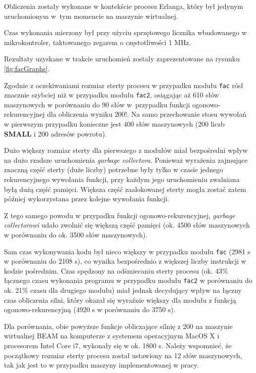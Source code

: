 Obliczenia zostały wykonane w kontekście procesu Erlanga, który był jedynym uruchomionym w~tym momencie na maszynie wirtualnej.

Czas wykonania mierzony był przy użyciu sprzętowego licznika wbudowanego w mikrokontroler, taktowanego zegarem o częstotliwości 1 MHz.

Rezultaty uzyskane w trakcie uruchomień zostały zaprezentowane na rysunku \ref{fig:facGraphs}.


Zgodnie z oczekiwaniami rozmiar sterty procesu w przypadku modułu \texttt{fac} rósł znacznie szybciej niż w przypadku modułu \texttt{fac2}, osiągając aż 610 słów maszynowych
w porównaniu do 90 słów w~przypadku funkcji ogonowo-rekurencyjnej dla obliczenia wyniku $200!$.
Na samo przechowanie stosu wywołań w pierwszym przypadku konieczne jest 400 słów maszynowych (200 liczb \textbf{SMALL} i 200 adresów powrotu).

Dużo większy rozmiar sterty dla pierwszego z modułów miał bezpośredni wpływ na dużo rzadsze uruchomienia \emph{garbage collectora}.
Ponieważ wyrażenia zajmujące znaczną część sterty (duże liczby) potrzebne były tylko w czasie jednego rekurencyjnego wywołania funkcji, przy każdym jego uruchomieniu zwalniana byłą dużą część pamięci. Większa część zaalokowanej sterty mogła zostać zatem później wykorzystana przez kolejne wywołania funkcji.

Z tego samego powodu w przypadku funkcji ogonowo-rekurencyjnej, \emph{garbage collectorowi} udało zwolnić się większą część pamięci (ok. 4500 słów maszynowych w porównaniu do ok. 3500 słów maszynowych).

Sam czas wykonywania kodu był nieco większy w przypadku modułu \texttt{fac} (2981 \textmugreek s w porównaniu do 2108 \textmugreek s), co wynika bezpośrednio z większej liczby instrukcji w kodzie pośrednim.
Czas spędzony na odśmiecaniu sterty procesu (ok. 43\% łącznego czasu wykonania programu w przypadku modułu \texttt{fac2} w porównaniu do ok. 21\% czasu dla drugiego modułu) miał jednak decydujący wpływ na łączny czas obliczenia silni, który okazał się wyraźnie większy dla modułu z funkcją ogonowo-rekurencyjną (4920 \textmugreek s w porównaniu do 3750 \textmugreek s).

Dla porównania, obie powyższe funkcje obliczające silnię z 200 na maszynie wirtualnej BEAM na komputerze z systemem operacyjnym MacOS X i procesorem Intel Core i7, wykonały się w ok. 1800 \textmugreek s.
Należy wspomnieć, że początkowy rozmiar sterty procesu został ustawiony na 12 słów maszynowych, tak jak jest to w przypadku maszyny implementowanej w pracy.


